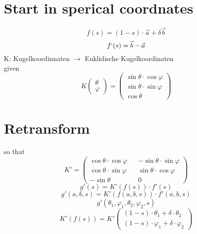 \section{Start in sperical coordnates}
\begin{equation}
f(s)=(1-s)\cdot\vec{a}+\delta\vec{b}
\end{equation}
\begin{equation}
    f`(s)=\vec{b}-\vec{a}
\end{equation}
K: Kugelkoordinnaten $\rightarrow$ Euklidische Kugelkoordinaten\\
given
\begin{equation*}
    K \begin{pmatrix}\theta \\ \varphi\end{pmatrix}=
    \begin{pmatrix}
        \sin\theta\cdot\cos\varphi \\
        \sin\theta\cdot\sin\varphi \\
        \cos\theta
    \end{pmatrix}
\end{equation*}
\section{Retransform}
so that
\begin{equation}
    K'=
    \begin{pmatrix}
       \cos\theta\cdot\cos\varphi && -\sin\theta\cdot\sin\varphi \\
       \cos\theta\cdot\sin\varphi && \sin\theta\cdot\cos\varphi \\
       -\sin\theta && 0
    \end{pmatrix}
\end{equation}
\begin{equation}
    g'(s) = K'(f(s))\cdot f'(s)
\end{equation}
\begin{equation}
    g'(a,b,s) = K'(f(a,b,s))\cdot f'(a,b,s)
\end{equation}
\begin{equation}
    g'(\theta_1,\varphi_1,\theta_2,\varphi_2,s)
\end{equation}
\begin{equation}
    K'(f(s))=K'
    \begin{pmatrix}
        (1-s)\cdot\theta_1 + \delta\cdot\theta_2 \\
        (1-s)\cdot\varphi_1 + \delta\cdot\varphi_2
    \end{pmatrix}
\end{equation}

